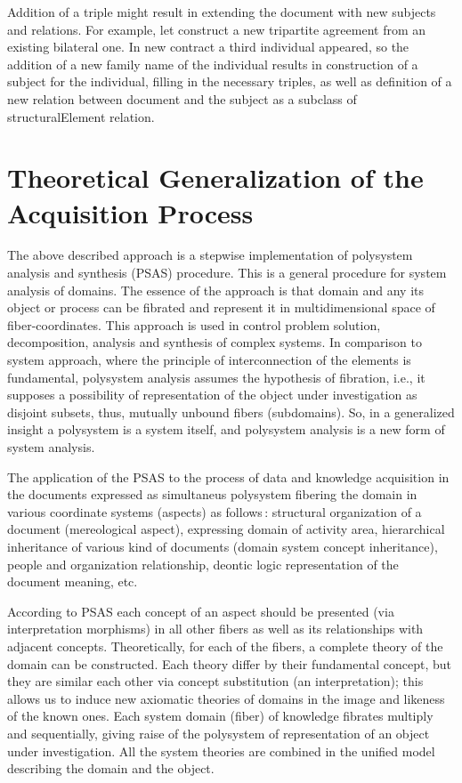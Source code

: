 \documentclass[conference]{IEEEtran}
\begin{document}
Addition of a triple might result in extending the document with new subjects and relations. For example, let construct a new tripartite agreement from an existing bilateral one. In new contract a third individual appeared, so the addition of a new family name of the individual results in construction of a subject for the individual, filling in the necessary triples, as well as definition of a new relation between document and the subject as a subclass of structuralElement relation.

\section{Theoretical Generalization of the Acquisition Process}

The above described approach is a stepwise implementation of polysystem analysis and synthesis \cite{father} (PSAS) procedure. This is a general procedure for system analysis of domains. The essence of the approach is that domain and any its object or process can be fibrated and represent it in multidimensional space of fiber-coordinates. This approach is used in control problem solution, decomposition, analysis and synthesis of complex systems. In comparison to system approach, where the principle of interconnection of the elements is fundamental, polysystem analysis assumes the hypothesis of fibration, i.e., it supposes a possibility of representation of the object under investigation as disjoint subsets, thus, mutually unbound fibers (subdomains). So, in a generalized insight a polysystem is a system itself, and polysystem analysis is a new form of system analysis.

The application of the PSAS to the process of data and knowledge acquisition in the documents expressed as simultaneus polysystem fibering the domain in various coordinate systems (aspects) as follows\,: structural organization of a document (mereological aspect), expressing domain of activity area, hierarchical inheritance of various kind of documents (domain system concept inheritance), people and organization relationship, deontic logic representation of the document meaning, etc.

According to PSAS \cite{father} each concept of an aspect should be presented (via interpretation morphisms) in all other fibers as well as its relationships with adjacent concepts. Theoretically, for each of the fibers, a complete theory of the domain can be constructed. Each theory differ by their fundamental concept, but they are similar each other via concept substitution (an interpretation); this allows us to induce new axiomatic theories of domains in the image and likeness of the known ones. Each system domain (fiber) of knowledge fibrates multiply and sequentially, giving raise of the polysystem of representation of an object under investigation. All the system theories are combined in the unified model describing the domain and the object.
\end{document}
